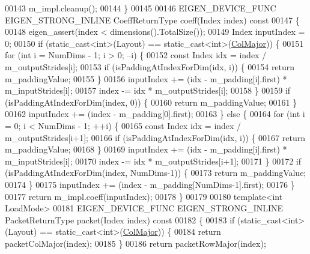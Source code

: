 \begin{DoxyCode}
00143     m\_impl.cleanup();
00144   \}
00145 
00146   EIGEN\_DEVICE\_FUNC EIGEN\_STRONG\_INLINE CoeffReturnType coeff(Index index)\textcolor{keyword}{ const}
00147 \textcolor{keyword}{  }\{
00148     eigen\_assert(index < dimensions().TotalSize());
00149     Index inputIndex = 0;
00150     \textcolor{keywordflow}{if} (static\_cast<int>(Layout) == static\_cast<int>(\hyperlink{group__enums_ggaacded1a18ae58b0f554751f6cdf9eb13a0cbd4bdd0abcfc0224c5fcb5e4f6669a}{ColMajor})) \{
00151       \textcolor{keywordflow}{for} (\textcolor{keywordtype}{int} i = NumDims - 1; i > 0; --i) \{
00152         \textcolor{keyword}{const} Index idx = index / m\_outputStrides[i];
00153         \textcolor{keywordflow}{if} (isPaddingAtIndexForDim(idx, i)) \{
00154           \textcolor{keywordflow}{return} m\_paddingValue;
00155         \}
00156         inputIndex += (idx - m\_padding[i].first) * m\_inputStrides[i];
00157         index -= idx * m\_outputStrides[i];
00158       \}
00159       \textcolor{keywordflow}{if} (isPaddingAtIndexForDim(index, 0)) \{
00160         \textcolor{keywordflow}{return} m\_paddingValue;
00161       \}
00162       inputIndex += (index - m\_padding[0].first);
00163     \} \textcolor{keywordflow}{else} \{
00164       \textcolor{keywordflow}{for} (\textcolor{keywordtype}{int} i = 0; i < NumDims - 1; ++i) \{
00165         \textcolor{keyword}{const} Index idx = index / m\_outputStrides[i+1];
00166         \textcolor{keywordflow}{if} (isPaddingAtIndexForDim(idx, i)) \{
00167           \textcolor{keywordflow}{return} m\_paddingValue;
00168         \}
00169         inputIndex += (idx - m\_padding[i].first) * m\_inputStrides[i];
00170         index -= idx * m\_outputStrides[i+1];
00171       \}
00172       \textcolor{keywordflow}{if} (isPaddingAtIndexForDim(index, NumDims-1)) \{
00173         \textcolor{keywordflow}{return} m\_paddingValue;
00174       \}
00175       inputIndex += (index - m\_padding[NumDims-1].first);
00176     \}
00177     \textcolor{keywordflow}{return} m\_impl.coeff(inputIndex);
00178   \}
00179 
00180   \textcolor{keyword}{template}<\textcolor{keywordtype}{int} LoadMode>
00181   EIGEN\_DEVICE\_FUNC EIGEN\_STRONG\_INLINE PacketReturnType packet(Index index)\textcolor{keyword}{ const}
00182 \textcolor{keyword}{  }\{
00183     \textcolor{keywordflow}{if} (static\_cast<int>(Layout) == static\_cast<int>(\hyperlink{group__enums_ggaacded1a18ae58b0f554751f6cdf9eb13a0cbd4bdd0abcfc0224c5fcb5e4f6669a}{ColMajor})) \{
00184       \textcolor{keywordflow}{return} packetColMajor(index);
00185     \}
00186     \textcolor{keywordflow}{return} packetRowMajor(index);

\end{DoxyCode}
